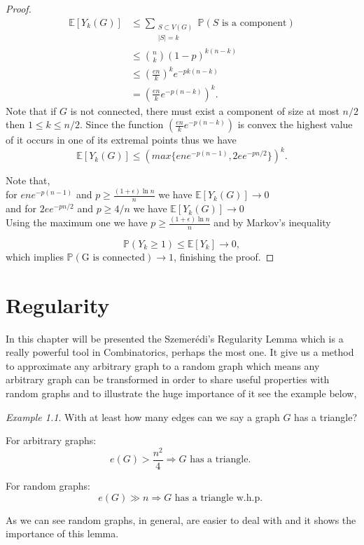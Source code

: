 \documentclass[12pt,twoside,a4paper]{book}
\numberwithin{equation}{section}
\let\log=\ln
\theoremstyle{remark}
\newtheorem{example}	[theorem] {Example}
\begin{document}
\begin{proof}
\begin{align*}
\mathbb{E}[Y_k (G)]  & \leq \sum_{\substack{S\subset V(G) \\ |S| = k}} \mathbb{P}(S\text{ is a component})\\
&\leq \binom{n}{k}(1-p)^{k(n-k)}\\
&\leq \left( \frac{en}{k} \right) ^k e^{-pk(n-k)}\\
& = \left( \frac{en}{k} e^{-p(n-k)} \right)^k.
\end{align*}
Note that if $G$ is not connected, there must exist a component of size at most $ n/2$ then $1 \leq k \leq n/2$. Since the function $\left( \frac{en}{k} e^{-p(n-k)} \right)$ is convex the highest value of it occurs in one of its extremal points thus we have
$$\mathbb{E}[Y_k (G)] \leq (max\{ene^{-p(n-1)}, 2ee^{-pn/2}\})^k .$$

Note that, \\
for $ene^{-p(n-1)}$ and $p \geq \frac{(1 + \epsilon) \log n}{n}$ we have $\mathbb{E}[Y_k (G)] \rightarrow 0$\\
and for $2ee^{-pn/2}$ and $p \geq 4/n$ we have $\mathbb{E}[Y_k (G)] \rightarrow 0$\\

Using the maximum one we have $p \geq \frac{(1 + \epsilon) \log n}{n}$  and by Markov's inequality

 $$\mathbb{P}(Y_k \geq 1) \leq \mathbb{E}[Y_k] \rightarrow 0,$$
 which implies $\mathbb{P}(\text{G is connected}) \rightarrow 1$, finishing the proof.

\end{proof}
\chapter{Regularity}
In this chapter will be presented the Szemerédi's Regularity Lemma which is a really powerful tool in Combinatorics,  perhaps the most one. It give us a method to approximate any arbitrary graph to a random graph which means any arbitrary graph can be transformed in order to share useful properties with random graphs and to illustrate the huge importance of it see the example below,

\begin{example}
With at least how many edges can we say a graph $G$ has a triangle?

For arbitrary graphs:
$$ e(G) > \frac{n^2}{4} \Rightarrow G \text{ has a triangle. }$$

For random graphs:
$$ e(G) \gg n \Rightarrow G\text{ has a triangle w.h.p. } $$

As we can see random graphs, in general, are easier to deal with and it shows the importance of this lemma.
\end{example}
\end{document}
